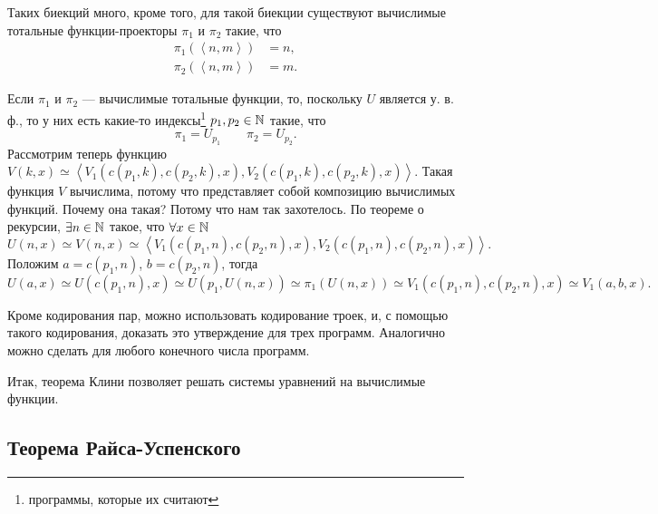 Таких биекций много, кроме того, для такой биекции существуют вычислимые тотальные функции-проекторы $\pi_{1}$ и $\pi_{2}$ такие, что
\begin{align}
    \pi_{1}\left(\left\langle n, m \right\rangle\right) &= n, \\
    \pi_{2}\left(\left\langle n, m \right\rangle\right) &= m.
\end{align}

Если $\pi_{1}$ и $\pi_{2}$ --- вычислимые тотальные функции, то, поскольку $U$ является у. в. ф., то у них есть какие-то индексы\footnote{программы, которые их считают} $p_{1}, p_{2} \in \mathbb{N}$ такие, что
$$
    \pi_{1} = U_{p_{1}} \qquad \pi_{2} = U_{p_{2}}.
$$
Рассмотрим теперь функцию $V\left(k, x\right) \simeq \left\langle V_{1}\left(c(p_{1}, k), c\left(p_{2}, k\right), x\right), V_{2}\left(c(p_{1}, k), c\left(p_{2}, k\right), x\right)\right\rangle$.
Такая функция $V$ вычислима, потому что представляет собой композицию вычислимых функций.
Почему она такая?
Потому что нам так захотелось.
По теореме о рекурсии, $\exists n \in \mathbb{N}$ такое, что $\forall x \in \mathbb{N}$
$$
    U(n, x) \simeq V(n, x) \simeq \left\langle V_{1}\left(c(p_{1}, n), c\left(p_{2}, n\right), x\right), V_{2}\left(c(p_{1}, n), c\left(p_{2}, n\right), x\right)\right\rangle.
$$
Положим $a = c(p_{1}, n)$, $b = c(p_{2}, n)$, тогда
$$
    U\left(a, x\right) \simeq U\left(c\left(p_{1}, n\right), x\right) \simeq U\left(p_{1}, U\left(n, x\right)\right) \simeq \pi_{1}\left(U\left(n, x\right)\right) \simeq V_{1}\left(c\left(p_{1}, n\right), c\left(p_{2}, n\right), x\right) \simeq V_{1}\left(a, b, x\right).
$$

Кроме кодирования пар, можно использовать кодирование троек, и, с помощью такого кодирования, доказать это утверждение для трех программ.
Аналогично можно сделать для любого конечного числа программ.

Итак, теорема Клини позволяет решать системы уравнений на вычислимые функции.

\subsection{Теорема Райса-Успенского}

